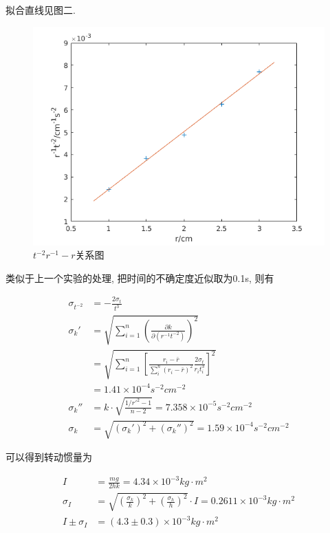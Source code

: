 \documentclass[a4paper,12pt,notitlepage]{article}
\begin{document}
	拟合直线见图二. \\
	
\begin{figure}[h]
\centering
	\includegraphics[scale=0.7]{figure_2.png}
	\caption{$t^{-2}r^{-1}-r$关系图}
\end{figure}

	类似于上一个实验的处理, 把时间的不确定度近似取为0.1s, 则有
	
\begin{align*}
	\sigma_{t^{-2}} &= -\frac{2\sigma_t}{t^3} \\
	\sigma_k' &= \sqrt{\sum_{i = 1}^n(\frac{\partial k}{\partial (r^{-1}t^{-2})})^2} \\
	&= \sqrt{\sum_{i = 1}^n[\frac{r_i - \bar{r}}{\sum_i^n(r_i - \bar{r})^2}\frac{2\sigma_t}{r_i t_i^3}]^2} \\
	&= 1.41 \times 10^{-4} s^{-2}cm^{-2} \\
	\sigma_k'' &= k\cdot \sqrt{\frac{1/r'^2 - 1}{n -2}} = 7.358 \times 10^{-5} s^{-2}cm^{-2} \\
	\sigma_k &= \sqrt{(\sigma_k')^2 + (\sigma_k'')^2} = 1.59 \times 10^{-4} s^{-2}cm^{-2}
\end{align*} 

	可以得到转动惯量为
	
\begin{align*}
	I &= \frac{mg}{2hk} = 4.34 \times 10^{-3} kg \cdot m^2 \\
	\sigma_I &= \sqrt{(\frac{\sigma_k}{k})^2+(\frac{\sigma_h}{h})^2} \cdot I =  0.2611 \times 10^{-3} kg\cdot m^2 \\
	I \pm \sigma_I &= (4.3 \pm 0.3) \times 10^{-3} kg\cdot m^2
\end{align*}
\end{document}
